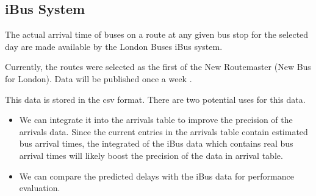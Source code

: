 \subsection{iBus System}
The actual arrival time of buses on a route at any given bus stop for the selected day are made available by the London Buses iBus system.

Currently, the routes were selected as the first of the New Routemaster (New Bus for London). Data will be published once a week \cite{buses_performance_data}.

This data is stored in the \acrshort{csv} format. There are two potential uses for this data.
\begin{itemize}
	\item We can integrate it into the arrivals table to improve the precision of the arrivals data. Since the current entries in the arrivals table contain estimated bus arrival times, the integrated of the iBus data which contains real bus arrival times will likely boost the precision of the data in arrival table.
	\item We can compare the predicted delays with the iBus data for performance evaluation.
\end{itemize}
